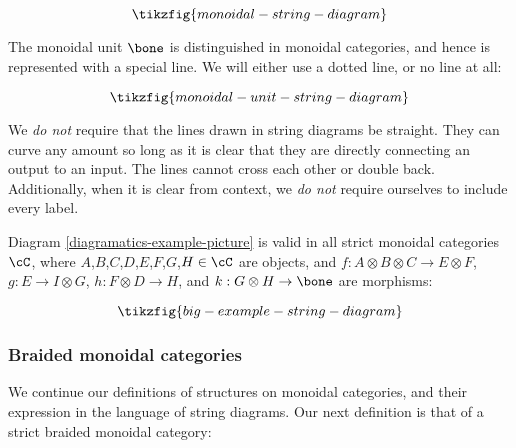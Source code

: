 \begin{equation*}
\tikzfig{monoidal-string-diagram}
\end{equation*}

The monoidal unit $\bone$ is distinguished in monoidal categories, and hence is represented with a special line. We will either use a dotted line, or no line at all:

\begin{equation*}
\tikzfig{monoidal-unit-string-diagram}
\end{equation*}

\begin{rem} We {\em do not} require that the lines drawn in string diagrams be straight. They can curve any amount so long as it is clear that they are directly connecting an output to an input. The lines cannot cross each other or double back. Additionally, when it is clear from context, we {\em do not} require ourselves to include every label.
\end{rem}

\begin{ex} 
Diagram \ref{diagramatics-example-picture} is valid in all strict monoidal categories $\cC$, where $A$,$B$,$C$,$D$,$E$,$F$,$G$,$H\in \cC$ are objects, and $f:A\otimes B\otimes C \to E\otimes F$, $g: E \to I\otimes G$, $h: F\otimes D\to H$, and $k:G\otimes H \to \bone$ are morphisms:

\begin{equation}\label{diagramatics-example-picture}
\tikzfig{big-example-string-diagram}
\end{equation}

\end{ex}

\subsubsection{Braided monoidal categories}

We continue our definitions of structures on monoidal categories, and their expression in the language of string diagrams. Our next definition is that of a strict braided monoidal category:


